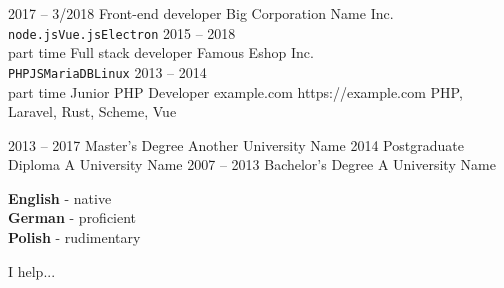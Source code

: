 
\begin{entrylist}
    \entry
        {2017 -- 3/2018}
        {Front-end developer}
        {Big Corporation Name Inc.}
        {}
        {}
        {\lorem \lorem \lorem\\ \texttt{node.js}\slashsep\texttt{Vue.js}\slashsep\texttt{Electron}}
    \entry
        {2015 -- 2018\\\footnotesize{part time}}
        {Full stack developer}
        {Famous Eshop Inc.}
        {}
        {}
        {\lorem\lorem\\ \texttt{PHP}\slashsep\texttt{JS}\slashsep\texttt{MariaDB}\slashsep\texttt{Linux}}
    \entry
        {2013 -- 2014\\{\footnotesize part time }}
        {Junior PHP Developer}
        {example.com}
        {https://example.com}
        {PHP, Laravel, Rust, Scheme, Vue}
        {\entryitems{\lorem, \lorem}}
\end{entrylist}



\begin{entrylist}
    \entry
        {2013 -- 2017}
        {Master's Degree}
        {Another University Name}
        {}
        {}
        {\lorem\lorem\lorem}
    \entry
        {2014}
        {Postgraduate Diploma}
        {A University Name}
        {}
        {}
        {\lorem\lorem}
    \entry
        {2007 -- 2013}
        {Bachelor's Degree}
        {A University Name}
        {}
        {}
        {\lorem\lorem}
\end{entrylist}


\begin{minipage}[t]{0.3\textwidth}
    \vspace{-\baselineskip}
    \textbf{English} - native\\
    \textbf{German} - proficient\\
    \textbf{Polish} - rudimentary
\end{minipage}
%
\hfill
\begin{minipage}[t]{0.3\textwidth}
    \vspace{-\baselineskip}
\end{minipage}
%
\hfill
\begin{minipage}[t]{0.3\textwidth}
    \vspace{-\baselineskip}
    I help... \lorem
\end{minipage}


